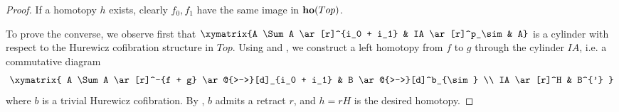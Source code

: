 \begin{proof}
If a homotopy $h$ exists, clearly $f_0, f_1$ have the same image in ${\bf ho}(Top)$. 

To prove the converse, we observe first that $\xymatrix{A \Sum A \ar[r]^{i_0 + i_1} & IA \ar[r]^p_\sim & A}$ is a cylinder with respect to the Hurewicz cofibration structure in $Top$. Using  and , we construct a left homotopy from $f$ to $g$ through the cylinder $IA$, i.e. a commutative diagram
\[
\xymatrix{
    A \Sum A \ar[r]^-{f + g} \ar@{>->}[d]_{i_0 + i_1} & B \ar@{>->}[d]^b_{\sim} \\
    IA \ar[r]^H & B^{'}
    }
\]
where $b$ is a trivial Hurewicz cofibration. By , $b$ admits a retract $r$, and $h = rH$ is the desired homotopy.
\end{proof}
